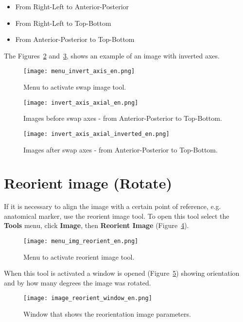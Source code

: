 \begin{itemize}
	\item From Right-Left to Anterior-Posterior
	\item From Right-Left to Top-Bottom
	\item From Anterior-Posterior to Top-Bottom
\end{itemize}


The Figures~\ref{fig:invert_axis_axial} and~\ref{fig:invert_axis_axial_inverted}, shows an example of an image with inverted axes.

\begin{figure}[!htb]
\centering
\texttt{[image: menu\_invert\_axis\_en.png]}
\caption{Menu to activate swap image tool.}
\label{fig:menu_invert_axis}
\end{figure}

\begin{figure}[!htb]
\centering
\texttt{[image: invert\_axis\_axial\_en.png]}
\caption{Images before swap axes - from Anterior-Posterior to Top-Bottom.}
\label{fig:invert_axis_axial}
\end{figure}

\begin{figure}[!htb]
\centering
\texttt{[image: invert\_axis\_axial\_inverted\_en.png]}
\caption{Images after swap axes - from Anterior-Posterior to Top-Bottom.}
\label{fig:invert_axis_axial_inverted}
\end{figure}

\section{Reorient image (Rotate)}

If it is necessary to align the image with a certain point of reference, e.g. anatomical marker, use the reorient image tool. To open this tool select the \textbf{Tools} menu, click \textbf{Image}, then \textbf{Reorient Image} (Figure~\ref{fig:menu_img_reorient}).

\begin{figure}[!htb]
\centering
\texttt{[image: menu\_img\_reorient\_en.png]}
\caption{Menu to activate reorient image tool.}
\label{fig:menu_img_reorient}
\end{figure}

When this tool is activated a window is opened (Figure~\ref{fig:image_reorient_window}) showing orientation and by how many degrees the image was rotated.

\begin{figure}[!htb]
\centering
\texttt{[image: image\_reorient\_window\_en.png]}
\caption{Window that shows the reorientation image parameters.}
\label{fig:image_reorient_window}
\end{figure}

